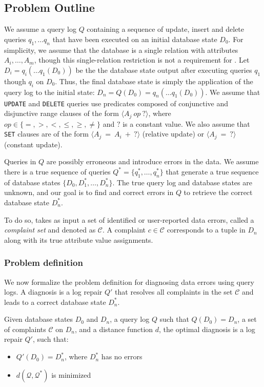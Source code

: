 \subsection{Problem Outline}

We assume a query log $Q$ containing a sequence of update, insert and delete queries 
$q_1, \ldots q_n$  that have been executed on an initial database state $D_0$.  
For simplicity, we assume that the database is a single relation with attributes 
$A_i,\ldots,A_m$, though this single-relation restriction is not a requirement for \sys.
Let $D_i = q_i(\ldots q_1(D_0))$ be the the database state output after executing queries $q_1$ though $q_i$ on $D_0$.
Thus, the final database state is simply the application of the query log to
the initial state: $D_n = Q(D_0) = q_n(\ldots q_1(D_0))$.
We assume that \texttt{UPDATE} and \texttt{DELETE} queries use predicates composed of conjunctive and disjunctive range clauses
of the form $\langle A_j\ op\ ?\rangle$, where $op \in \{=, >, <, \le, \ge, \ne\}$ and $?$ is a constant value.
We also assume that \texttt{SET} clauses are of the form $\langle A_j\ =\ A_i\ +\ ? \rangle$ (relative update) or $\langle A_j\ =\ ?\rangle$ (constant update).

Queries in $Q$ are possibly erroneous and introduce errors in the data.  We assume there is 
a true sequence of queries $Q^* = \{q^*_1,\ldots,q^*_n\}$ that generate a true sequence of database states
$\{D_0, D^*_1,\ldots,D^*_n\}$.  The true query log and database states are unknown, and our goal is to 
find and correct errors in $Q$ to retrieve the correct database state $D^*_n$.

To do so, \sys takes as input a set of identified or user-reported
data errors, called a {\it complaint set} and denoted as $\mathcal{C}$. 
A complaint $c \in \mathcal{C}$ corresponds to a tuple in $D_n$ along with its true attribute value assignments.  



\subsubsection*{Problem definition}

We now formalize the problem definition for diagnosing data
errors using query logs. A diagnosis is a log repair
$Q'$ that resolves all complaints in the set $\mathcal{C}$
and leads to a correct database state $D_n^*$.

\vspace*{-0.1in}
\begin{definition}\label{def:problem}
    Given database states $D_0$ and $D_n$, a query log $Q$ 
    such that $Q(D_0)=D_n$, a set of complaints $\mathcal{C}$ on $D_n$,  
    and a distance function $d$, the optimal diagnosis is a 
    log repair $Q'$, such that:
    \begin{itemize}[itemsep=0pt, parsep=0pt]
        \item $Q'(D_0)=D_n^*$, where $D_n^*$ has no errors
        \item $d(\mathcal{Q}, \mathcal{Q}^*)$ is minimized
    \end{itemize}
\end{definition}
\vspace*{-0.1in}

